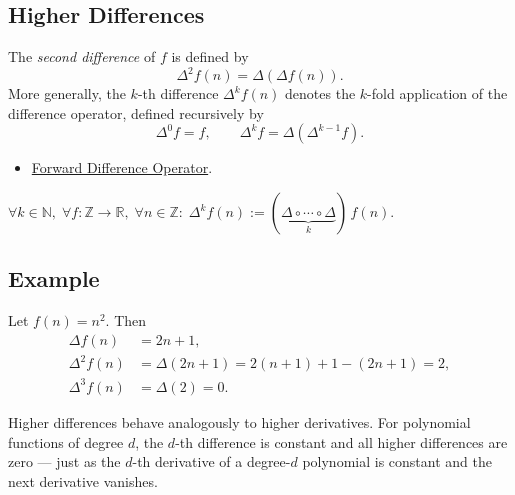 
\subsection{Higher Differences}
\label{subsec:higher-differences}

\begin{definition}
\label{def:higher-differences}
The \emph{second difference} of \(f\) is defined by
\[
\Delta^2 f(n) = \Delta(\Delta f(n)).
\]
More generally, the \(k\)-th difference \(\Delta^k f(n)\) denotes the
\(k\)-fold application of the difference operator, defined recursively by
\[
\Delta^0 f = f, \qquad \Delta^k f = \Delta(\Delta^{k-1} f).
\]
\end{definition}

\begin{dependencies}
\begin{itemize}
  \item \hyperref[def:forward-difference]{Forward Difference Operator}.
\end{itemize}
\end{dependencies}

\begin{remark*}
\(\forall k \in \mathbb{N},\; \forall f : \mathbb{Z}\to\mathbb{R},\;
\forall n \in \mathbb{Z}:\;
\Delta^k f(n) := (\underbrace{\Delta \circ \cdots \circ \Delta}_{k})\,f(n)\).
\end{remark*}

\subsection*{Example}

Let \(f(n) = n^2\). Then
\[
\begin{aligned}
\Delta f(n) &= 2n + 1,\\
\Delta^2 f(n) &= \Delta(2n+1) = 2(n+1)+1 - (2n+1) = 2,\\
\Delta^3 f(n) &= \Delta(2) = 0.
\end{aligned}
\]

\begin{remark*}
Higher differences behave analogously to higher derivatives.
For polynomial functions of degree \(d\), the \(d\)-th difference is
constant and all higher differences are zero --- just as the \(d\)-th
derivative of a degree-\(d\) polynomial is constant and the next
derivative vanishes.
\end{remark*}
